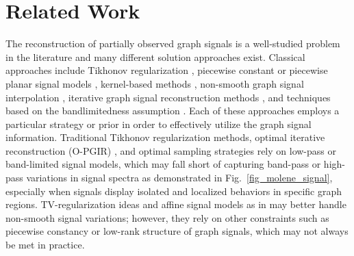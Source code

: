 \section{Related Work}
\label{sec_related_work}




The reconstruction of partially observed graph signals is a well-studied problem in the literature and many different solution approaches exist. Classical approaches include Tikhonov regularization \cite{shuman2013emerging}, piecewise constant or piecewise planar signal models \cite{JungHMJHE19, ChenCZ24}, kernel-based methods \cite{JianTE24}, non-smooth graph signal interpolation \cite{MAZARGUIL2022108480, ioannidis2019semi}, iterative graph signal reconstruction methods \cite{narang2013localized, wang2015local, christensen2003frames, 8918094}, and techniques based on the bandlimitedness assumption \cite{8918094,  LorenzoBIBL18, YangYYH21, WangCYLF23}. Each of these approaches employs a particular strategy or prior in order to effectively utilize the graph signal information. Traditional Tikhonov regularization methods, optimal iterative reconstruction (O-PGIR) \cite{8918094}, and optimal sampling  \cite{LorenzoBIBL18, YangYYH21} strategies rely on low-pass or band-limited signal models, which may fall short of capturing band-pass or high-pass variations in signal spectra as demonstrated in Fig.~\ref{fig_molene_signal},  especially when signals display isolated and localized behaviors in specific graph regions. TV-regularization ideas \cite{JungHMJHE19} and affine signal models as in \cite{MAZARGUIL2022108480} may better handle non-smooth signal variations; however, they rely on other constraints such as piecewise constancy or low-rank structure of graph signals, which may not always be met in practice.








